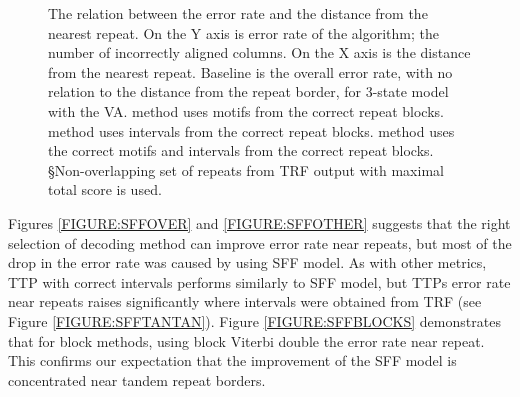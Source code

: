 \begin{figure}
\begin{center}
\caption{
The relation between the error rate and the distance from the nearest repeat. On the Y
axis is error rate of the algorithm; the number of incorrectly aligned columns.
On the X axis is the distance from the nearest repeat. Baseline is the overall
error rate, with no relation to the distance from the repeat border, for
3-state model with the VA.
\M method uses motifs from the correct repeat blocks.
\D method uses intervals from the correct repeat blocks.
\MM method uses the correct motifs and intervals from the
    correct repeat blocks.
\S Non-overlapping set of repeats from TRF output with maximal total
    score is used.}\label{FIGURE:SFF_GRAPHS} 
\end{center}
\end{figure}

Figures \ref{FIGURE:SFFOVER} and \ref{FIGURE:SFFOTHER} suggests that the right
selection of decoding method can improve error rate near repeats, but most of
the drop in the error rate was caused by using SFF model. As with other
metrics, TTP with correct intervals performs similarly to SFF model, but TTPs
error rate near repeats raises significantly where intervals were obtained from
TRF (see Figure \ref{FIGURE:SFFTANTAN}).  Figure \ref{FIGURE:SFFBLOCKS}
demonstrates that for block methods, using block Viterbi double the error rate
near repeat.  This confirms our expectation that the improvement of the SFF
model is concentrated near tandem repeat borders.

